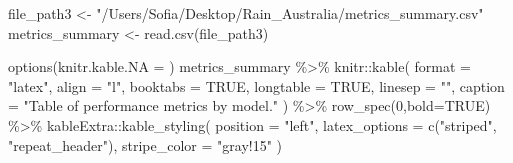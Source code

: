 \documentclass[
]{article}
\newenvironment{Shaded}{\begin{snugshade}}{\end{snugshade}}
\newcommand{\AttributeTok}[1]{\textcolor[rgb]{0.77,0.63,0.00}{#1}}
\newcommand{\ConstantTok}[1]{\textcolor[rgb]{0.00,0.00,0.00}{#1}}
\newcommand{\DecValTok}[1]{\textcolor[rgb]{0.00,0.00,0.81}{#1}}
\newcommand{\FunctionTok}[1]{\textcolor[rgb]{0.00,0.00,0.00}{#1}}
\newcommand{\NormalTok}[1]{#1}
\newcommand{\OtherTok}[1]{\textcolor[rgb]{0.56,0.35,0.01}{#1}}
\newcommand{\SpecialCharTok}[1]{\textcolor[rgb]{0.00,0.00,0.00}{#1}}
\newcommand{\StringTok}[1]{\textcolor[rgb]{0.31,0.60,0.02}{#1}}
\begin{document}
\begin{Shaded}
\begin{Highlighting}[]
\NormalTok{file\_path3 }\OtherTok{\textless{}{-}} \StringTok{"/Users/Sofia/Desktop/Rain\_Australia/metrics\_summary.csv"}
\NormalTok{metrics\_summary }\OtherTok{\textless{}{-}} \FunctionTok{read.csv}\NormalTok{(file\_path3)}

\FunctionTok{options}\NormalTok{(}\AttributeTok{knitr.kable.NA =} \StringTok{\textquotesingle{}\textquotesingle{}}\NormalTok{)}
\NormalTok{metrics\_summary }\SpecialCharTok{\%\textgreater{}\%}
\NormalTok{  knitr}\SpecialCharTok{::}\FunctionTok{kable}\NormalTok{(}
    \AttributeTok{format =} \StringTok{"latex"}\NormalTok{,}
    \AttributeTok{align =} \StringTok{"l"}\NormalTok{,}
    \AttributeTok{booktabs =} \ConstantTok{TRUE}\NormalTok{,}
    \AttributeTok{longtable =} \ConstantTok{TRUE}\NormalTok{,}
    \AttributeTok{linesep =} \StringTok{""}\NormalTok{,}
    \AttributeTok{caption =} \StringTok{"Table of performance metrics by model."}
\NormalTok{    ) }\SpecialCharTok{\%\textgreater{}\%} \FunctionTok{row\_spec}\NormalTok{(}\DecValTok{0}\NormalTok{,}\AttributeTok{bold=}\ConstantTok{TRUE}\NormalTok{) }\SpecialCharTok{\%\textgreater{}\%} 
\NormalTok{  kableExtra}\SpecialCharTok{::}\FunctionTok{kable\_styling}\NormalTok{(}
      \AttributeTok{position =} \StringTok{"left"}\NormalTok{,}
      \AttributeTok{latex\_options =} \FunctionTok{c}\NormalTok{(}\StringTok{"striped"}\NormalTok{, }\StringTok{"repeat\_header"}\NormalTok{),}
      \AttributeTok{stripe\_color =} \StringTok{"gray!15"}
\NormalTok{    )}
\end{Highlighting}
\end{Shaded}
\end{document}
